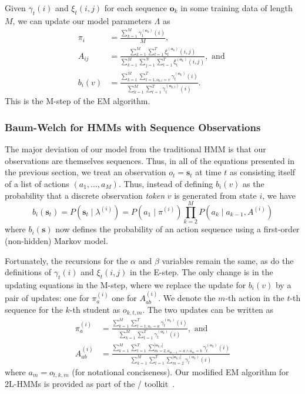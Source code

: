 Given $\gamma_t(i)$ and $\xi_t(i,j)$ for each sequence $\mathbf{o}_k$ in
some training data of length $M$, we can update our model parameters
$\Lambda$ as
\begin{align}
  \pi_i &= \frac{\sum_{k=1}^M \gamma^{(\mathbf{o}_k)}_1(i)}{M},\\
  A_{ij} &= \frac{\sum_{k=1}^M \sum_{t=1}^T \xi^{(\mathbf{o}_k)}_t(i,j)}
  {\sum_{k=1}^M \sum_{j=1}^N \sum_{t=1}^T \xi^{(\mathbf{o}_k)}_t(i,j)},
  \text{ and }\\
  b_i(v) &= \frac{\sum_{k=1}^M \sum_{t=1, o_{k,t} = v}^T
  \gamma^{(\mathbf{o}_k)}_t(i)}
  {\sum_{k=1}^M \sum_{t=1}^T \gamma^{(\mathbf{o}_{k,t})}_t(i)}.
\end{align}
This is the M-step of the EM algorithm.

\subsubsection{Baum-Welch for HMMs with Sequence Observations}
The major deviation of our model from the traditional HMM is that our
observations are themselves sequences. Thus, in all of the equations
presented in the previous section, we treat an observation $o_t =
\mathbf{s}_t$ at time $t$ as consisting itself of a list of actions $(a_1,
\ldots, a_M)$. Thus, instead of defining $b_i(v)$ as the probability that a
discrete observation \emph{token} $v$ is generated from state $i$, we have
\begin{equation}
  b_i(\mathbf{s}_t) = P(\mathbf{s}_t \mid \lambda^{(i)})
  = P(a_1 \mid \pi^{(i)}) \prod_{k=2}^M P(a_k \mid
  a_{k-1}, A^{(i)})
\end{equation}
where $b_i(\mathbf{s})$ now defines the probability of an action sequence
using a first-order (non-hidden) Markov model.

Fortunately, the recursions for the $\alpha$ and $\beta$ variables remain
the same, as do the definitions of $\gamma_t(i)$ and $\xi_t(i,j)$ in the
E-step. The only change is in the updating equations in the M-step,
where we replace the update for $b_i(v)$ by a pair of updates: one for
$\pi^{(i)}_a$ one for $A^{(i)}_{ab}$. We denote the $m$-th action in the
$t$-th sequence for the $k$-th student as $o_{k,t,m}$. The two updates can
be written as
\begin{align}
  \pi^{(i)}_{a}
  &= \frac{\sum_{k=1}^M \sum_{t=1,a_1 = a}^T \gamma^{(\mathbf{o}_k)}_t(i)}
  {\sum_{k=1}^M \sum_{t=1}^T \gamma^{(\mathbf{o}_k)}_t(i)}, \text{ and }\\
  A^{(i)}_{ab}
  &= \frac{\sum_{k=1}^M \sum_{t=1}^T
  \sum_{m=2,a_{m-1}=a \land a_m = b}^{|\mathbf{o}_{k,t}|}
  \gamma^{(\mathbf{o}_k)}_t(i)}
  {\sum_{k=1}^M \sum_{t=1}^T \sum_{m=2}^{|\mathbf{o}_{k,t}|}
  \gamma^{(\mathbf{o}_k)}_t(i)}
\end{align}
where $a_m = o_{t,k,m}$ (for notational conciseness). Our modified EM
algorithm for 2L-HMMs is provided as part of the \meta/
toolkit~\citemeta{}.
